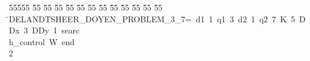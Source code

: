 %
%
\begin{tabbing}
55555 \= 55 \= 55 \= 55 \= 55 \= 55 \= 55 \= 55 \= 55 \= 55 \= 55 \= 55 \= 55 \= \>DELANDTSHEER\_DOYEN\_PROBLEM\_3\_7=\ d1\ 1\ q1\ 3\ d2\ 1\ q2\ 7\ K\ 5\ DDx\ 3\ DDy\ 1\ searc\\[0pt]
\>h\_control\ W\ end\ \\[0pt]
2\>\end{tabbing}
